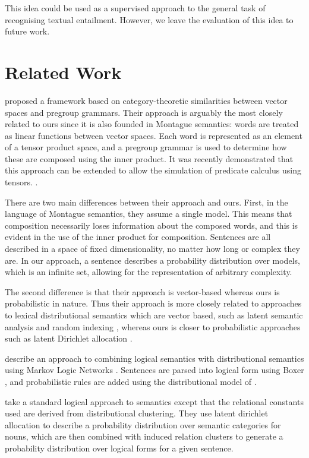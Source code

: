 \documentclass[letterpaper]{article}
\newcommand{\citet}[1]{\newcite{#1}}
\begin{document}
This
idea could be used as a supervised approach to the general task of recognising textual
entailment.  However, we leave the evaluation of this idea to future
work.

\section{Related Work}


\citet{Coecke:10} proposed a framework based on category-theoretic
similarities between vector spaces and pregroup grammars. Their
approach is arguably the most closely related to ours since it is also
founded in Montague semantics: words are treated as linear functions
between vector spaces. Each word is represented as an element of a
tensor product space, and a pregroup grammar is used to determine how
these are composed using the inner product. It was recently
demonstrated that this approach can be extended to allow the
simulation of predicate calculus using
tensors. \cite{Grefenstette:13}.

There are two main differences between their approach and ours. First,
in the language of Montague semantics, they assume a single
model. This means that composition necessarily loses information about
the composed words, and this is evident in the use of the inner
product for composition. Sentences are all described in a space of
fixed dimensionality, no matter how long or complex they are. In our
approach, a sentence describes a probability distribution over models,
which is an infinite set, allowing for the representation of arbitrary
complexity.

The second difference is that their approach is vector-based whereas
ours is probabilistic in nature. Thus their approach is more
closely related to approaches to lexical distributional semantics
which are vector based, such as latent semantic analysis
\cite{Deerwester:90} and random indexing \cite{Sahlgren:02}, whereas
ours is closer to probabilistic approaches such as latent Dirichlet
allocation \cite{Blei:03}.

\citet{Garrette:11} describe an approach to combining logical
semantics with distributional semantics using Markov Logic Networks
\cite{Richardson:06}. Sentences are parsed into logical form using
Boxer \cite{Bos:04}, and probabilistic rules are added using the
distributional model of \citet{Erk:10}.

\citet{Lewis:13} take a standard logical approach to semantics except
that the relational constants used are derived from distributional
clustering. They use latent dirichlet allocation to describe a
probability distribution over semantic categories for nouns, which are
then combined with induced relation clusters to generate a probability
distribution over logical forms for a given sentence.
\end{document}
